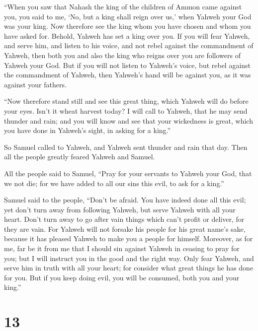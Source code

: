  ``When you saw that Nahash the king of the children of
Ammon came against you, you said to me, `No, but a king shall reign over
us,' when Yahweh your God was your king.  Now therefore see
the king whom you have chosen and whom you have asked for. Behold,
Yahweh has set a king over you.  If you will fear Yahweh,
and serve him, and listen to his voice, and not rebel against the
commandment of Yahweh, then both you and also the king who reigns over
you are followers of Yahweh your God.  But if you will not
listen to Yahweh's voice, but rebel against the commandment of Yahweh,
then Yahweh's hand will be against you, as it was against your fathers.

 ``Now therefore stand still and see this great thing,
which Yahweh will do before your eyes.  Isn't it wheat
harvest today? I will call to Yahweh, that he may send thunder and rain;
and you will know and see that your wickedness is great, which you have
done in Yahweh's sight, in asking for a king.''

 So Samuel called to Yahweh, and Yahweh sent thunder and
rain that day. Then all the people greatly feared Yahweh and Samuel.

 All the people said to Samuel, ``Pray for your servants to
Yahweh your God, that we not die; for we have added to all our sins this
evil, to ask for a king.''

 Samuel said to the people, ``Don't be afraid. You have
indeed done all this evil; yet don't turn away from following Yahweh,
but serve Yahweh with all your heart.  Don't turn away to
go after vain things which can't profit or deliver, for they are vain.
 For Yahweh will not forsake his people for his great
name's sake, because it has pleased Yahweh to make you a people for
himself.  Moreover, as for me, far be it from me that I
should sin against Yahweh in ceasing to pray for you; but I will
instruct you in the good and the right way.  Only fear
Yahweh, and serve him in truth with all your heart; for consider what
great things he has done for you.  But if you keep doing
evil, you will be consumed, both you and your king.''

\hypertarget{section-12}{%
\section{13}\label{section-12}}

